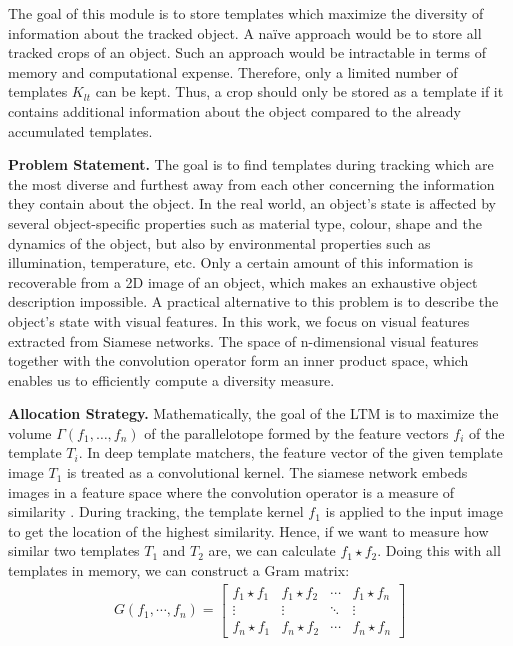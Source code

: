 \documentclass{article}
\begin{document}
The goal of this module is to store templates which maximize the diversity of information about the tracked object. A na\"ive approach would be to store all tracked crops of an object. Such an approach would be intractable in terms of memory and computational expense. Therefore, only a limited number of templates $K_{lt}$ can be kept. Thus, a crop should only be stored as a template if it contains additional information about the object compared to the already accumulated templates.

\textbf{Problem Statement.} The goal is to find templates during tracking which are the most diverse and furthest away from each other concerning the information they contain about the object. In the real world, an object's state is affected by several object-specific properties such as material type, colour, shape and the dynamics of the object, but also by environmental properties such as illumination, temperature, etc. Only a certain amount of this information is recoverable from a 2D image of an object, which makes an exhaustive object description impossible. A practical alternative to this problem is to describe the object's state with visual features. In this work, we focus on visual features extracted from Siamese networks. The space of n-dimensional visual features together with the convolution operator form an inner product space, which enables us to efficiently compute a diversity measure.

\textbf{Allocation Strategy.} Mathematically, the goal of the LTM is to maximize the volume $\Gamma(f_1,\dots,f_n)$ of the parallelotope formed by the feature vectors $f_i$ of the template $T_i$. In deep template matchers, the feature vector of the given template image $T_1$ is treated as a convolutional kernel. The siamese network embeds images in a feature space where the convolution operator is a measure of similarity \cite{bertinetto2016fully}. During tracking, the template kernel $f_1$ is applied to the input image to get the location of the highest similarity. Hence, if we want to measure how similar two templates $T_1$ and $T_2$ are, we can calculate $f_1\star f_2$. Doing this with all templates in memory, we can construct a Gram matrix:
\begin{gather}
G(f_1,\cdots,f_n)=  
\begin{bmatrix}
    f_1\star f_1 & f_1 \star f_2 &\cdots &f_1 \star f_n \\
    \vdots       &\vdots         &\ddots &\vdots        \\
   f_n \star f_1 &f_n \star f_2  &\cdots &f_n \star f_n
\end{bmatrix}
\end{gather}
\end{document}
